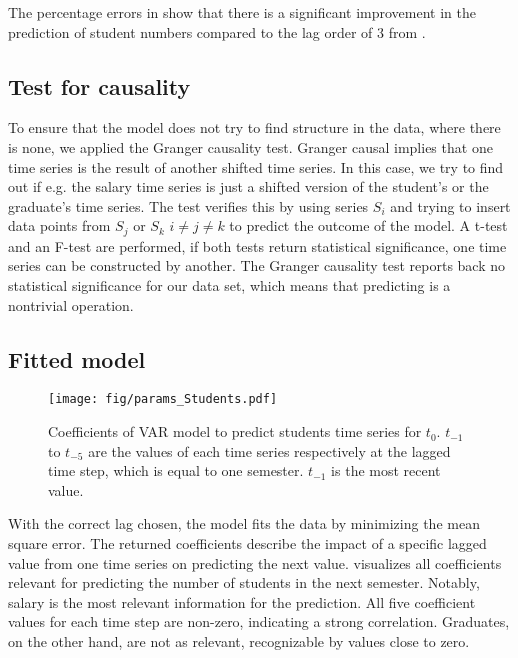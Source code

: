 \documentclass{article}
\theoremstyle{plain}
\theoremstyle{definition}
\theoremstyle{remark}
\begin{document}
The percentage errors in  show that there is a significant improvement in the prediction of student numbers
compared to the lag order of $3$ from .

\subsection{Test for causality}\label{sec:methods:causality}
To ensure that the model does not try to find structure in the data, where there is none, we applied the Granger causality test.
Granger causal implies that one time series is the result of another shifted time series.
In this case, we try to find out if e.g. the salary time series is just a shifted version of the student's or the graduate's time series.
The test verifies this by using series $S_i$ and trying to insert data points from $S_j$ or $S_k$ $i \neq j\neq k$
to predict the outcome of the model.
A t-test and an F-test are performed, if both tests return statistical significance, one time series can be constructed by another.
The Granger causality test reports back no statistical significance for our data set, which means that predicting is a nontrivial
operation.





\subsection{Fitted model}\label{sec:methods:fit}
\begin{figure}[t]
    \texttt{[image: fig/params\_Students.pdf]}
    \caption{Coefficients of VAR model to predict students time series
    for $t_0$. $t_{-1}$ to $t_{-5}$ are the values of each time series respectively at the lagged time step, which is equal to one semester.
    $t_{-1}$ is the most recent value.}
    \label{fig:student coefficients}
\end{figure}

With the correct lag chosen, the model fits the data by minimizing the mean square error.
The returned coefficients describe the impact of a specific lagged value from one time series
on predicting the next value.  visualizes all coefficients
relevant for predicting the number of students in the next semester. 
Notably, salary is the most relevant information for the prediction. All five
coefficient values for each time step are non-zero, indicating a strong correlation.
Graduates, on the other hand, are not as relevant, recognizable by values close to zero.
\end{document}
